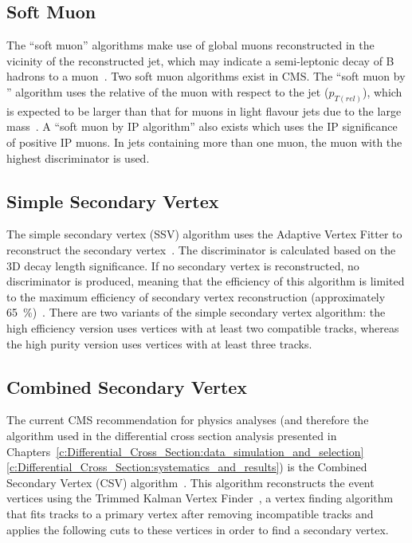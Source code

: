 \subsection{Soft Muon}
\label{ss:soft_muon}
The ``soft muon'' algorithms make use of global muons reconstructed in the vicinity of the reconstructed jet,
which may indicate a semi-leptonic decay of B hadrons to a muon~\cite{CMS-AN-2009-085}. Two soft muon
algorithms exist in CMS. The ``soft muon by \pt'' algorithm uses the relative \pt of the muon with respect to
the jet ($p_{T(rel)}$), which is expected to be larger than that for muons in light flavour jets due to the
large \bquark mass~\cite{CMS-AN-2009-085, Ferro:2012tg}. A ``soft muon by IP algorithm'' also exists which
uses the IP significance of positive IP muons. In jets containing more than one muon, the muon with the
highest discriminator is used.

\subsection{Simple Secondary Vertex}
\label{ss:simple_secondary_vertex}
The simple secondary vertex (SSV) algorithm uses the Adaptive Vertex Fitter to reconstruct the secondary
vertex~\cite{0954-3899-34-12-N01}. The discriminator is calculated based on the 3D decay length significance.
If no secondary vertex is reconstructed, no discriminator is produced, meaning that the efficiency of this
algorithm is limited to the maximum efficiency of secondary vertex reconstruction (approximately
65~\%)~\cite{Chatrchyan:2012jua}. There are two variants of the simple secondary vertex algorithm: the high
efficiency version uses vertices with at least two compatible tracks, whereas the high purity version uses
vertices with at least three tracks.

\subsection{Combined Secondary Vertex}
\label{ss:combined_secondary_vertex}
The current CMS recommendation for physics analyses (and therefore the algorithm used in the differential
cross section analysis presented in
Chapters~\ref{c:Differential_Cross_Section:data_simulation_and_selection}\textendash\ref{c:Differential_Cross_Section:systematics_and_results})
is the Combined Secondary Vertex (CSV) algorithm~\cite{Weiser:2006md}. This algorithm reconstructs the event
vertices using the Trimmed Kalman Vertex Finder~\cite{Speer:927395}, a vertex finding algorithm that fits
tracks to a primary vertex after removing incompatible tracks and applies the following cuts to these vertices
in order to find a secondary vertex.

